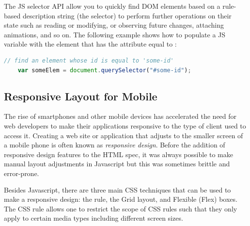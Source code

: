 The JS selector API allow you to quickly find DOM elements based on a rule-based description string (the selector) to perform further operations on their state such as reading or modifying, or observing future changes, attaching animations, and so on. 
The following example shows how to populate a JS variable with the element that has the  attribute equal to :

\begin{lstlisting}[language=JavaScript,numbers=none]
	// find an element whose id is equal to 'some-id'
	var someElem = document.querySelector("#some-id");
\end{lstlisting}










\subsection{Responsive Layout for Mobile}

The rise of smartphones and other mobile devices has accelerated the need for web developers to make their applications responsive to the type of client used to access it.
Creating a web site or application that adjusts to the smaller screen of a mobile phone is often known as \textit{responsive design}.
Before the addition of responsive design features to the HTML spec, 
it was always possible to make manual layout adjustments in Javascript but this was sometimes brittle and error-prone.

Besides Javascript, there are three main CSS techniques that can be used to make a responsive design: 
the  rule, 
the Grid layout, 
and Flexible (Flex) boxes.
The CSS  rule allows one to restrict the scope of CSS rules such that they only apply to certain media types including different screen sizes.

